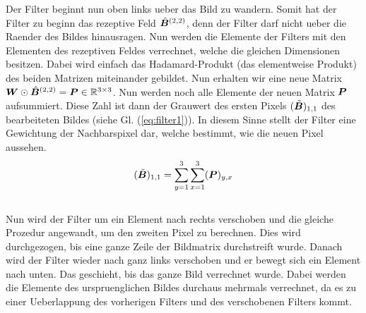 \para{}
Der Filter beginnt nun oben links ueber das Bild zu wandern. Somit
hat der Filter zu beginn das rezeptive Feld $\hat{\bm{B}}^{(2,2)}$, denn der
Filter darf nicht ueber die Raender des Bildes hinausragen.
Nun werden die Elemente der Filters mit den Elementen des rezeptiven Feldes
verrechnet, welche die gleichen Dimensionen besitzen. Dabei wird einfach das
Hadamard-Produkt (das elementweise Produkt) des beiden Matrizen miteinander
gebildet. Nun erhalten wir eine neue Matrix $\bm{W} \odot
\hat{\bm{B}}^{(2,2)} = \bm{P} \in \mathbb{R}^{3 \times 3}$.
Nun werden noch alle Elemente der neuen Matrix $\bm{P}$
aufsummiert. Diese Zahl ist dann der Grauwert des ersten Pixels $(\tilde{\bm{B}})_{1,1}$ des bearbeiteten
Bildes (siehe Gl. (\ref{eq:filter1})). In diesem Sinne stellt der Filter eine Gewichtung der Nachbarspixel dar, welche
bestimmt, wie die neuen Pixel aussehen.
\\
\begin{equation}\label{eq:filter1}
  (\tilde{\bm{B}})_{1,1} = \sum_{y=1}^3 \sum_{x=1}^3 (\bm{P})_{y,x}
\end{equation}
\\
Nun wird der Filter um ein Element nach rechts verschoben und die gleiche
Prozedur angewandt, um den zweiten Pixel zu berechnen. Dies
wird durchgezogen, bis eine ganze Zeile der Bildmatrix durchstreift wurde.
Danach wird der Filter wieder nach ganz links verschoben und er bewegt sich ein
Element nach unten. Das geschieht, bis das ganze Bild verrechnet wurde.
Dabei werden die Elemente des urspruenglichen Bildes durchaus mehrmals
verrechnet, da es zu einer Ueberlappung des vorherigen Filters und des
verschobenen Filters kommt.
\para{}


